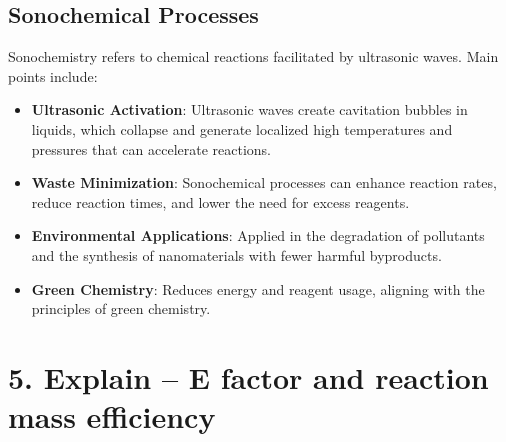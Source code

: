 \documentclass[11pt]{article}
\begin{document}
\subsection{Sonochemical Processes}
Sonochemistry refers to chemical reactions facilitated by ultrasonic waves. Main points include:
\begin{itemize}
    \item \textbf{Ultrasonic Activation}: Ultrasonic waves create cavitation bubbles in liquids, which collapse and generate localized high temperatures and pressures that can accelerate reactions.
    \item \textbf{Waste Minimization}: Sonochemical processes can enhance reaction rates, reduce reaction times, and lower the need for excess reagents.
    \item \textbf{Environmental Applications}: Applied in the degradation of pollutants and the synthesis of nanomaterials with fewer harmful byproducts.
    \item \textbf{Green Chemistry}: Reduces energy and reagent usage, aligning with the principles of green chemistry.
\end{itemize}


\section{5. Explain – E factor and reaction mass efficiency}
\end{document}
